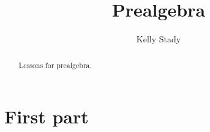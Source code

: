 \documentclass{xourse}
\title{Prealgebra}
\author{Kelly Stady}
\begin{document}
\begin{abstract}
    Lessons for prealgebra.
\end{abstract}
\maketitle

\part{First part}

\end{document}
